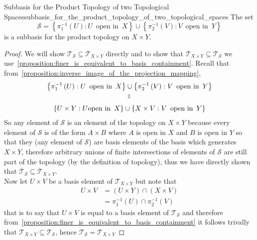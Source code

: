 \begin{proposition}
{Subbasis for the Product Topology of two Topological
Spaces}{subbasis_for_the_product_topology_of_two_topological_spaces}
The set
\[
\mathcal{S} = \left\{\pi _{1} ^{-1} \left(U\right) : U \enspace
\text{open in} \enspace X \right\} \cup \left\{\pi _{2} ^{-1} \left(V
\right) : V \enspace \text{open in} \enspace Y \right\}
\]
is a subbasis for the product topology on \(X \times Y \).
\end{proposition}
\begin{proof}
    We will show \(\mathcal{T} _ \mathcal{S} \subseteq \mathcal{T} _{X
    \times Y} \) directly and to show that \(\mathcal{T} _{X \times Y}
    \subseteq \mathcal{T} _ \mathcal{S} \) we use~\ref{proposition:finer_is_equivalent_to_basis_containment}. Recall that
    from~\ref{proposition:inverse_image_of_the_projection_mapping},
    \begin{gather*}
    \left\{\pi _{1} ^{-1} \left(U\right) : U \enspace
    \text{open in} \enspace X \right\} \cup \left\{\pi _{2} ^{-1} \left(V
\right) : V \enspace \text{open in} \enspace Y \right\}\\
    \verteq\\
    \left\{U \times Y: U \text{open in} \enspace X \right\} \cup \left\{X
    \times V: V \enspace \text{open in} \enspace Y \right\}
    \end{gather*}
    So any element of \(\mathcal{S} \) is an element of the topology on \(
    X \times Y\) because every element of \(\mathcal{S} \) is of the form \(A
    \times B \) where \(A \) is open in \(X \) and \(B \) is open in \(Y \)
    so that they (any element of \(\mathcal{S} \)) are basis elements of the
    basis which generates \(X \times Y \), therefore arbitrary unions of finite
    intersections of elements of \(\mathcal{S} \) are still part of the
    topology (by the definition of topology), thus we have directly shown that
    \(\mathcal{T} _{\mathcal{S}} \subseteq \mathcal{T} _{X \times Y
} \). \\
    Now let \(U \times V \) be a basis element of \(\mathcal{T} _{X \times
    Y} \) but note that
    \begin{align*}
        U \times V &= \left(U \times Y\right) \cap \left(X \times V\right)
        \\
                   &= \pi _{1} ^{-1} \left(U\right) \cap \pi _{2} ^{-1}
                   \left(V\right)
    \end{align*}
    that is to say that \(U \times V \) is equal to a basis element of \(
    \mathcal{T} _{\mathcal{S}} \) and therefore
    from~\ref{proposition:finer_is_equivalent_to_basis_containment} it follows
    trivally that \(\mathcal{T} _{X \times Y} \subseteq \mathcal{T} _{
    \mathcal{S}} \), hence \( \mathcal{ T } _{ \mathcal{ S }   } = \mathcal{ T }
    _{ X \times Y } \) 
\end{proof}
